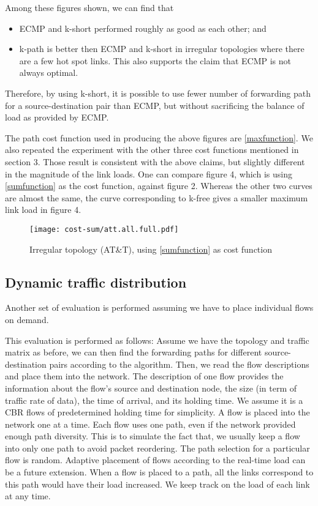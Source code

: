\documentclass[conference]{IEEEtran}
\begin{document}
Among these figures shown, we can find that
\begin{itemize}
\item ECMP and k-short performed roughly as good as each other; and
\item k-path is better then ECMP and k-short in irregular topologies where
there are a few hot spot links. This also supports the claim that ECMP is not
always optimal.
\end{itemize}
Therefore, by using k-short, it is possible to use fewer number of forwarding
path for a source-destination pair than ECMP, but without sacrificing the
balance of load as provided by ECMP.

The path cost function used in producing the above figures are
\eqref{maxfunction}. We also repeated the experiment with the other three cost
functions mentioned in section 3. Those result is consistent with the above
claims, but slightly different in the magnitude of the link loads. One can
compare figure 4, which is using \eqref{sumfunction} as the cost function,
against figure 2. Whereas the other two curves are almost the same, the curve
corresponding to k-free gives a smaller maximum link load in figure 4.

\begin{figure}
\centering\texttt{[image: cost-sum/att.all.full.pdf]}
\caption{Irregular topology (AT\&T), using \eqref{sumfunction} as cost function}
\end{figure}

\subsection{Dynamic traffic distribution}

Another set of evaluation is performed assuming we have to place individual
flows on demand. 

This evaluation is performed as follows: Assume we have the topology and
traffic matrix as before, we can then find the forwarding paths for different
source-destination pairs according to the algorithm. Then, we read the flow
descriptions and place them into the network. The description of one flow
provides the information about the flow's source and destination node, the size
(in term of traffic rate of data), the time of arrival, and its holding time.
We assume it is a CBR flows of predetermined holding time for simplicity. A
flow is placed into the network one at a time. Each flow uses one path, even if
the network provided enough path diversity. This is to simulate the fact that,
we usually keep a flow into only one path to avoid packet reordering. The path
selection for a particular flow is random. Adaptive placement of flows
according to the real-time load can be a future extension. When a flow is
placed to a path, all the links correspond to this path would have their load
increased. We keep track on the load of each link at any time.
\end{document}
